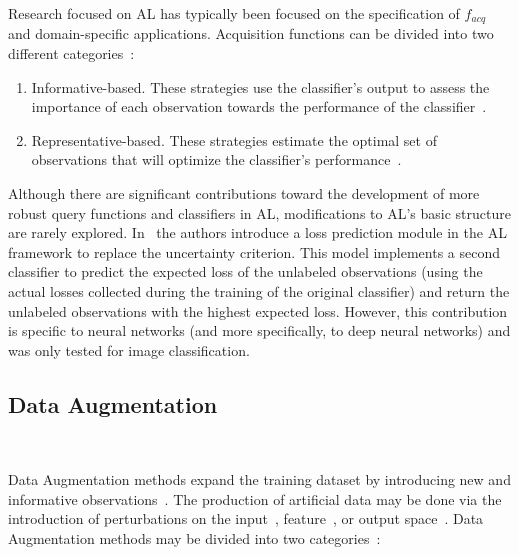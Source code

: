 Research focused on AL has typically been focused on the
specification of $f_{acq}$ and domain-specific
applications. Acquisition functions can be divided into two different
categories~\cite{Gu2021, Kumar2020}: 

\begin{enumerate}

    \item Informative-based. These strategies use the
        classifier's output to assess the importance of each observation
        towards the performance of the classifier~\cite{Fu2013}.

    \item Representative-based. These strategies estimate 
        the optimal set of observations that will optimize the classifier's
        performance~\cite{Kumar2020}.

\end{enumerate}

Although there are significant contributions toward the development of more
robust query functions and classifiers in AL, modifications to AL's basic
structure are rarely explored. In~\cite{Yoo2019} the authors introduce a loss
prediction module in the AL framework to replace the uncertainty criterion.
This model implements a second classifier to predict the expected loss of the
unlabeled observations (using the actual losses collected during the training
of the original classifier) and return the unlabeled observations with the
highest expected loss. However, this contribution is specific to neural
networks (and more specifically, to deep neural networks) and was only tested
for image classification.

\subsection{Data Augmentation}~\label{sec:data_augmentation-al-aug}

Data Augmentation methods expand the training dataset by introducing new and
informative observations~\cite{Behpour2019}. The production of artificial data
may be done via the introduction of perturbations on the
input~\cite{Fonseca2021}, feature~\cite{DeVries2017}, or output
space~\cite{Behpour2019}. Data Augmentation methods may be divided into
two categories~\cite{Shorten2019}:

